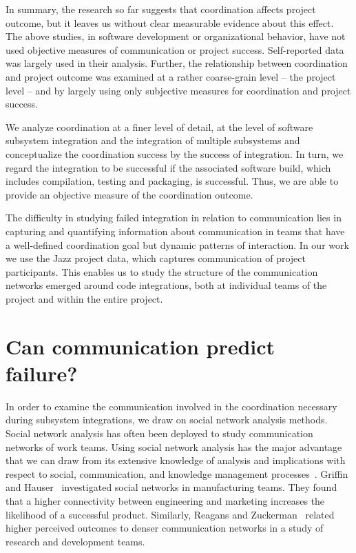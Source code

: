 In summary, the research so far suggests that coordination affects project
outcome, but it leaves us without clear measurable evidence about this effect.
The above studies, in software development or organizational behavior, have not
used objective measures of communication or project success. Self-reported data
was largely used in their analysis. Further, the relationship between
coordination and project outcome was examined at a rather coarse-grain level --
the project level -- and by largely using only subjective measures for
coordination and project success.

We analyze coordination at a finer level of detail, at the level of software
subsystem integration and the integration of multiple subsystems and
conceptualize the coordination success by the success of integration. In turn, we
regard the integration to be successful if the associated software build, which
includes compilation, testing and packaging, is successful. Thus, we are able to
provide an objective measure of the coordination outcome.


The difficulty in studying failed integration in relation to communication lies
in capturing and quantifying information about communication in teams that have a
well-defined coordination goal but dynamic patterns of interaction. In our work
we use the Jazz project data, which captures communication of project
participants. This enables us to study the structure of the communication
networks emerged around code integrations, both at individual teams of the
project and within the entire project.



\section{Can communication predict failure?}
\label{sec:ResearchQuestions}
In order to examine the communication involved in the coordination necessary
during subsystem integrations, we draw on social network analysis methods. Social
network analysis has often been deployed to study communication networks of work
teams. Using social network analysis has the major advantage that we can draw
from its extensive knowledge of analysis and implications with respect to social,
communication, and knowledge management
processes~\cite{Burt:1995vo,Freeman:1979rl}. Griffin and
Hauser~\cite{Griffin:1992ms} investigated social networks in manufacturing teams.
They found that a higher connectivity between engineering and marketing increases
the likelihood of a successful product. Similarly, Reagans and
Zuckerman~\cite{RayReagans:2001os} related higher perceived outcomes to denser
communication networks in a study of research and development teams.

